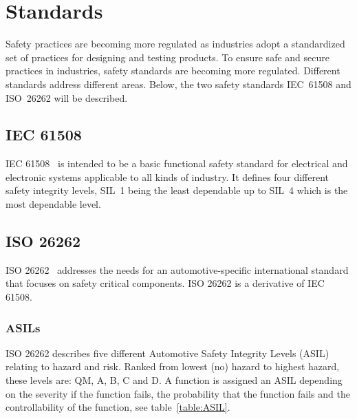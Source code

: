 
\section{Standards}
Safety practices are becoming more regulated as industries adopt a standardized set of practices for designing and testing products. %
To ensure safe and secure practices in industries, safety standards are becoming more regulated. Different standards address different areas. Below, the two safety standards IEC~61508 and ISO~26262 will be described.

\subsection{IEC 61508}
IEC 61508~\cite{IEC61508} is intended to be a basic functional safety standard for electrical and electronic systems applicable to all kinds of industry. It defines four different safety integrity levels, SIL~1 being the least dependable up to SIL~4 which is the most dependable level.

\subsection{ISO 26262}
ISO 26262~\cite{ISO26262} addresses the needs for an automotive-specific international standard that focuses on safety critical components. ISO 26262 is a derivative of IEC 61508.

\subsubsection{ASILs}
ISO 26262 describes five different Automotive Safety Integrity Levels (ASIL) relating to hazard and risk. Ranked from lowest (no) hazard to highest hazard, these levels are: QM, A, B, C and D. A function is assigned an ASIL depending on the severity if the function fails, the probability that the function fails and the controllability of the function, see table~\ref{table:ASIL}.

